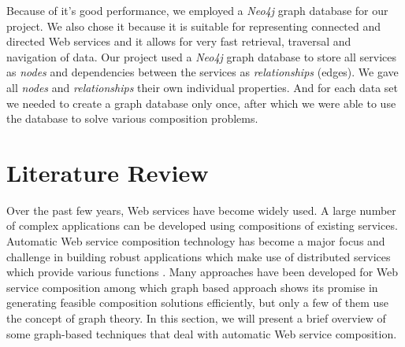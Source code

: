 Because of it's good performance, we employed a \emph{Neo4j} \cite{6} graph database for our project. We also chose it because it is suitable for representing connected and directed Web services and it allows for very fast retrieval, traversal and navigation of data. Our project used a \emph{Neo4j} graph database to store all services as \emph{nodes} and dependencies between the services as \emph{relationships} (edges). We gave all \emph{nodes} and \emph{relationships} their own individual properties. And for each data set we needed to create a graph database only once, after which we were able to use the database to solve various composition problems. \par

\section{Literature Review}
Over the past few years, Web services have become widely used. A large number of complex applications can be developed using compositions of existing services. Automatic Web service composition technology has become a major focus and challenge in building robust applications which make use of distributed services which provide various functions \cite{29}. Many approaches have been developed for Web service composition among which graph based approach shows its promise in generating feasible composition solutions efficiently, but only a few of them use the concept of graph theory. In this section, we will present a brief overview of some graph-based techniques that deal with automatic Web service composition.
\par

